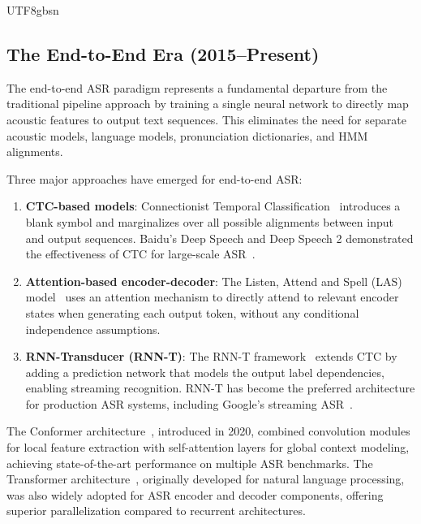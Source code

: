\documentclass[12pt,a4paper]{article}
\begin{document}
\begin{CJK}{UTF8}{gbsn}
\subsection{The End-to-End Era (2015--Present)}
\label{subsec:e2e}

The end-to-end ASR paradigm represents a fundamental departure from the traditional pipeline approach by training a single neural network to directly map acoustic features to output text sequences. This eliminates the need for separate acoustic models, language models, pronunciation dictionaries, and HMM alignments.

Three major approaches have emerged for end-to-end ASR:

\begin{enumerate}[leftmargin=*]
    \item \textbf{CTC-based models}: Connectionist Temporal Classification~\cite{graves2006connectionist} introduces a blank symbol and marginalizes over all possible alignments between input and output sequences. Baidu's Deep Speech and Deep Speech 2 demonstrated the effectiveness of CTC for large-scale ASR~\cite{hannun2014deep,amodei2016deep}.
    \item \textbf{Attention-based encoder-decoder}: The Listen, Attend and Spell (LAS) model~\cite{chan2016listen} uses an attention mechanism to directly attend to relevant encoder states when generating each output token, without any conditional independence assumptions.
    \item \textbf{RNN-Transducer (RNN-T)}: The RNN-T framework~\cite{graves2012sequence} extends CTC by adding a prediction network that models the output label dependencies, enabling streaming recognition. RNN-T has become the preferred architecture for production ASR systems, including Google's streaming ASR~\cite{he2019streaming}.
\end{enumerate}

The Conformer architecture~\cite{gulati2020conformer}, introduced in 2020, combined convolution modules for local feature extraction with self-attention layers for global context modeling, achieving state-of-the-art performance on multiple ASR benchmarks. The Transformer architecture~\cite{vaswani2017attention}, originally developed for natural language processing, was also widely adopted for ASR encoder and decoder components, offering superior parallelization compared to recurrent architectures.


\end{CJK}
\end{document}
